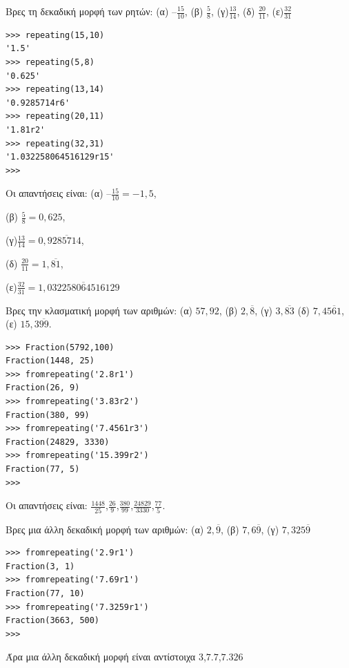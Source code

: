 \begin{exercise}
Βρες τη δεκαδική μορφή των ρητών: 
(α) $–\frac{15}{10}$,  (β) $\frac{5}{8}$, (γ)$\frac{13}{14}$, (δ) $\frac{20}{11}$, (ε)$\frac{32}{31}$
\end{exercise}
\begin{lstlisting}
>>> repeating(15,10)
'1.5'
>>> repeating(5,8)
'0.625'
>>> repeating(13,14)
'0.9285714r6'
>>> repeating(20,11)
'1.81r2'
>>> repeating(32,31)
'1.032258064516129r15'
>>> 
\end{lstlisting}
Οι απαντήσεις είναι:
(α) $–\frac{15}{10}=-1,5$,  

(β) $\frac{5}{8}=0,625$, 

(γ)$\frac{13}{14}=0,9\overline{285714}$, 

(δ) $\frac{20}{11}=1,\overline{81}$, 

(ε)$\frac{32}{31} = 1,\overline{032258064516129}$

\begin{exercise}
Βρες την κλασματική μορφή των αριθμών:
(α) $57,92$, (β) $2,\overline{8}$, (γ) $3,\overline{83}$ (δ) $7,4\overline{561}$, (ε) $15,3\overline{99}$.
\end{exercise}
\begin{lstlisting}
>>> Fraction(5792,100)
Fraction(1448, 25)
>>> fromrepeating('2.8r1')
Fraction(26, 9)
>>> fromrepeating('3.83r2')
Fraction(380, 99)
>>> fromrepeating('7.4561r3')
Fraction(24829, 3330)
>>> fromrepeating('15.399r2')
Fraction(77, 5)
>>> 
\end{lstlisting}
Οι απαντήσεις είναι:
$\frac{1448}{25}$,$\frac{26}{9}$,$\frac{380}{99}$,$\frac{24829}{3330}$,$\frac{77}{5}$.
\begin{exercise}
Bρες μια άλλη δεκαδική μορφή των αριθμών: (α) $2,\overline{9}$, (β) $7,6\overline{9}$, (γ) $7,325\overline{9}$
\end{exercise}
\begin{lstlisting}
>>> fromrepeating('2.9r1')
Fraction(3, 1)
>>> fromrepeating('7.69r1')
Fraction(77, 10)
>>> fromrepeating('7.3259r1')
Fraction(3663, 500)
>>> 
\end{lstlisting}
Άρα μια άλλη δεκαδική μορφή είναι αντίστοιχα $3$,$7.7$,$7.326$
